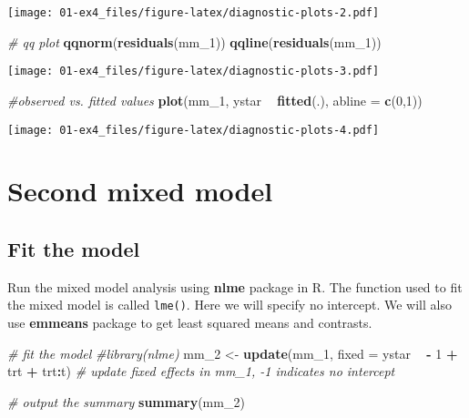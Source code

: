\documentclass[]{book}
\newenvironment{Shaded}{\begin{snugshade}}{\end{snugshade}}
\newcommand{\CommentTok}[1]{\textcolor[rgb]{0.56,0.35,0.01}{\textit{#1}}}
\newcommand{\DataTypeTok}[1]{\textcolor[rgb]{0.13,0.29,0.53}{#1}}
\newcommand{\DecValTok}[1]{\textcolor[rgb]{0.00,0.00,0.81}{#1}}
\newcommand{\KeywordTok}[1]{\textcolor[rgb]{0.13,0.29,0.53}{\textbf{#1}}}
\newcommand{\NormalTok}[1]{#1}
\newcommand{\OperatorTok}[1]{\textcolor[rgb]{0.81,0.36,0.00}{\textbf{#1}}}
\newcommand{\StringTok}[1]{\textcolor[rgb]{0.31,0.60,0.02}{#1}}
\begin{document}
\texttt{[image: 01-ex4\_files/figure-latex/diagnostic-plots-2.pdf]}

\begin{Shaded}
\begin{Highlighting}[]
\CommentTok{# qq plot}
\KeywordTok{qqnorm}\NormalTok{(}\KeywordTok{residuals}\NormalTok{(mm_}\DecValTok{1}\NormalTok{))}
\KeywordTok{qqline}\NormalTok{(}\KeywordTok{residuals}\NormalTok{(mm_}\DecValTok{1}\NormalTok{))}
\end{Highlighting}
\end{Shaded}

\texttt{[image: 01-ex4\_files/figure-latex/diagnostic-plots-3.pdf]}

\begin{Shaded}
\begin{Highlighting}[]
\CommentTok{#observed vs. fitted values}
\KeywordTok{plot}\NormalTok{(mm_}\DecValTok{1}\NormalTok{, ystar }\OperatorTok{~}\StringTok{ }\KeywordTok{fitted}\NormalTok{(.), }\DataTypeTok{abline =} \KeywordTok{c}\NormalTok{(}\DecValTok{0}\NormalTok{,}\DecValTok{1}\NormalTok{))}
\end{Highlighting}
\end{Shaded}

\texttt{[image: 01-ex4\_files/figure-latex/diagnostic-plots-4.pdf]}

\hypertarget{second-mixed-model}{%
\section{Second mixed model}\label{second-mixed-model}}

\hypertarget{fit-the-model-1}{%
\subsection{Fit the model}\label{fit-the-model-1}}

Run the mixed model analysis using \textbf{nlme} package in R. The function used to fit the mixed model is called \texttt{lme()}. Here we will specify no intercept. We will also use \textbf{emmeans} package to get least squared means and contrasts.

\begin{Shaded}
\begin{Highlighting}[]
\CommentTok{# fit the model}
\CommentTok{#library(nlme)}
\NormalTok{mm_}\DecValTok{2}\NormalTok{ <-}\StringTok{ }\KeywordTok{update}\NormalTok{(mm_}\DecValTok{1}\NormalTok{, }\DataTypeTok{fixed =}\NormalTok{ ystar }\OperatorTok{~}\StringTok{ }\OperatorTok{-}\StringTok{ }\DecValTok{1} \OperatorTok{+}\StringTok{ }\NormalTok{trt }\OperatorTok{+}\StringTok{ }\NormalTok{trt}\OperatorTok{:}\NormalTok{t) }\CommentTok{# update fixed effects in mm_1, -1 indicates no intercept}

\CommentTok{# output the summary}
\KeywordTok{summary}\NormalTok{(mm_}\DecValTok{2}\NormalTok{)}
\end{Highlighting}
\end{Shaded}
\end{document}
